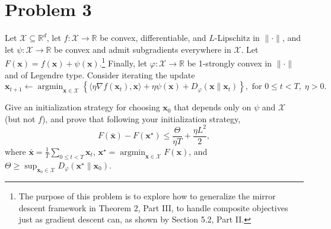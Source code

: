 \section*{Problem 3}

Let $\mathcal{X} \subseteq \mathbb{R}^d$, let $f : \mathcal{X} \to \mathbb{R}$ be convex, differentiable, and $L$-Lipschitz in $\|\cdot\|$, and let $\psi : \mathcal{X} \to \mathbb{R}$ be convex and admit subgradients everywhere in $\mathcal{X}$. Let $F(\mathbf{x}) = f(\mathbf{x}) + \psi(\mathbf{x})$.\footnote{The purpose of this problem is to explore how to generalize the mirror descent framework in Theorem 2, Part III, to handle composite objectives just as gradient descent can, as shown by Section 5.2, Part II.} Finally, let $\varphi : \mathcal{X} \to \mathbb{R}$ be 1-strongly convex in $\|\cdot\|$ and of Legendre type. Consider iterating the update
\[
\mathbf{x}_{t+1} \leftarrow \operatorname{argmin}_{\mathbf{x} \in \mathcal{X}} \left\{ \langle \eta \nabla f(\mathbf{x}_t), \mathbf{x} \rangle + \eta \psi(\mathbf{x}) + D_\varphi(\mathbf{x} \| \mathbf{x}_t) \right\} , \text{ for } 0 \le t < T, \; \eta > 0.
\]

Give an initialization strategy for choosing $\mathbf{x}_0$ that depends only on $\psi$ and $\mathcal{X}$ (but not $f$), and prove that following your initialization strategy,
\[
F(\bar{\mathbf{x}}) - F(\mathbf{x}^\star) \le \frac{\Theta}{\eta T} + \frac{\eta L^2}{2},
\]
where $\bar{\mathbf{x}} = \frac{1}{T} \sum_{0 \le t < T} \mathbf{x}_t$, $\mathbf{x}^\star = \operatorname{argmin}_{\mathbf{x} \in \mathcal{X}} F(\mathbf{x})$, and $\Theta \ge \sup_{\mathbf{x}_0 \in \mathcal{X}} D_\varphi(\mathbf{x}^\star \| \mathbf{x}_0)$.
